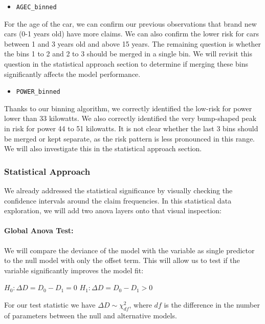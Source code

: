 \documentclass[
  english,
  11pt,
]{article}
\providecommand{\tightlist}{%
  \setlength{\itemsep}{0pt}\setlength{\parskip}{0pt}}
\begin{document}
\begin{itemize}
\tightlist
\item
  \texttt{AGEC\_binned}
\end{itemize}

For the age of the car, we can confirm our previous observations that
brand new cars (0-1 years old) have more claims. We can also confirm the
lower risk for cars between 1 and 3 years old and above 15 years. The
remaining question is whether the bins 1 to 2 and 2 to 3 should be
merged in a single bin. We will revisit this question in the statistical
approach section to determine if merging these bins significantly
affects the model performance.

\begin{itemize}
\tightlist
\item
  \texttt{POWER\_binned}
\end{itemize}

Thanks to our binning algorithm, we correctly identified the low-risk
for power lower than 33 kilowatts. We also correctly identified the very
bump-shaped peak in risk for power 44 to 51 kilowatts. It is not clear
whether the last 3 bins should be merged or kept separate, as the risk
pattern is less pronounced in this range. We will also investigate this
in the statistical approach section.

\subsubsection{Statistical Approach}\label{statistical-approach}

We already addressed the statistical significance by visually checking
the confidence intervals around the claim frequencies. In this
statistical data exploration, we will add two anova layers onto that
visual inspection:

\paragraph{Global Anova Test:}\label{global-anova-test}

We will compare the deviance of the model with the variable as single
predictor to the null model with only the offset term. This will allow
us to test if the variable significantly improves the model fit:

\(H_0: \Delta D = D_0 - D_1 = 0\) \(H_1: \Delta D = D_0 - D_1 > 0\)

For our test statistic we have \(\Delta D \sim \chi^2_{df}\), where
\(df\) is the difference in the number of parameters between the null
and alternative models.
\end{document}
